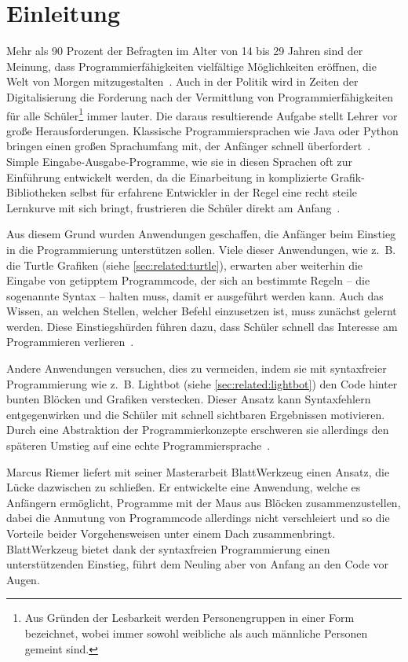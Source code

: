 \chapter{Einleitung}
\label{sec:intro}

Mehr als 90 Prozent der Befragten im Alter von 14 bis 29 Jahren sind der Meinung, dass Programmierfähigkeiten vielfältige Möglichkeiten eröffnen, die Welt von Morgen mitzugestalten~\cite{statista-1}. Auch in der Politik wird in Zeiten der Digitalisierung die Forderung nach der Vermittlung von Programmierfähigkeiten für alle Schüler\footnote{Aus Gründen der Lesbarkeit werden Personengruppen in einer Form bezeichnet, wobei immer sowohl weibliche als auch männliche Personen gemeint sind.} immer lauter. Die daraus resultierende Aufgabe stellt Lehrer vor große Herausforderungen. Klassische Programmiersprachen wie Java oder Python bringen einen großen Sprachumfang mit, der Anfänger schnell überfordert~\cite{ko2004}. Simple Eingabe-Ausgabe-Programme, wie sie in diesen Sprachen oft zur Einführung entwickelt werden, da die Einarbeitung in komplizierte Grafik-Bibliotheken selbst für erfahrene Entwickler in der Regel eine recht steile Lernkurve mit sich bringt, frustrieren die Schüler direkt am Anfang~\cite[63]{resnick2009}.

Aus diesem Grund wurden Anwendungen geschaffen, die Anfänger beim Einstieg in die Programmierung unterstützen sollen. Viele dieser Anwendungen, wie z.~B. die Turtle Grafiken (siehe \ref{sec:related:turtle}), erwarten aber weiterhin die Eingabe von getipptem Programmcode, der sich an bestimmte Regeln -- die sogenannte Syntax -- halten muss, damit er ausgeführt werden kann. Auch das Wissen, an welchen Stellen, welcher Befehl einzusetzen ist, muss zunächst gelernt werden. Diese Einstiegshürden führen dazu, dass Schüler schnell das Interesse am Programmieren verlieren~\cite{ko2004}.

Andere Anwendungen versuchen, dies zu vermeiden, indem sie mit syntaxfreier Programmierung wie z.~B. Lightbot (siehe \ref{sec:related:lightbot}) den Code hinter bunten Blöcken und Grafiken verstecken. Dieser Ansatz kann Syntaxfehlern entgegenwirken und die Schüler mit schnell sichtbaren Ergebnissen motivieren. Durch eine Abstraktion der Programmierkonzepte erschweren sie allerdings den späteren Umstieg auf eine echte Programmiersprache~\cite{gouws2013}.

Marcus Riemer liefert mit seiner Masterarbeit BlattWerkzeug einen Ansatz, die Lücke dazwischen zu schließen. Er entwickelte eine Anwendung, welche es Anfängern ermöglicht, Programme mit der Maus aus Blöcken zusammenzustellen, dabei die Anmutung von Programmcode allerdings nicht verschleiert und so die Vorteile beider Vorgehensweisen unter einem Dach zusammenbringt. BlattWerkzeug bietet dank der syntaxfreien Programmierung einen unterstützenden Einstieg, führt dem Neuling aber von Anfang an den Code vor Augen.

